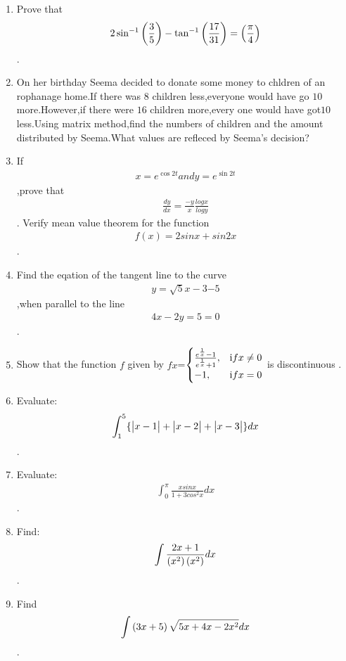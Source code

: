 \documentclass[12pt, letterpaper]{article}
\begin{document}
\begin{enumerate}
	\item Prove that \begin{align}2\sin^{-1}\left(\frac{3}{5}\right)-\tan^{-1}\left(\frac{17}{31}\right)=\left(\frac{\pi}{4}\right)\end{align}.
\item On her birthday Seema decided to donate some money to chldren of an rophanage home.If there was $8$ children less,everyone would have go \rupee $10$ more.However,if there were $16$ children more,every one would have got\rupee $10$ less.Using matrix method,find the numbers of children and the amount distributed by Seema.What values are refleced by Seema's decision?
\item If \begin{align}x=e^{\cos2t} and y=e^{\sin2t}\end{align},prove that \begin{align}\frac{dy}{dx}=\frac{-y}{x} \frac{logx}{logy}\end{align}. Verify mean value theorem for the function \begin{align}f(x)=2sinx+sin2x \end{align}.
	\item Find the eqation of the tangent line to the curve \begin{align}y={\sqrt5x-3}{-5}\end{align},when parallel to the line \begin{align}4x-2y=5=0\end{align} .
		\item Show that the function $f$ given by $fx$=$\begin{cases}\frac{e^{\frac{1}{x}}-1}{e^{\frac{1}{x}}+1},& \text if x\neq0\\ -1,& \text if x=0 \end{cases}$ is discontinuous . 
				\item Evaluate: \begin{align}\int_{1}^{5} \{\begin{vmatrix}x-1\end{vmatrix} + \begin{vmatrix}x-2\end{vmatrix} + \begin{vmatrix}x-3\end{vmatrix}\}dx\end{align}.
					\item Evaluate: \begin{align}\int_{0}^{\pi} \frac{xsinx}{1+3cos^2x}dx\end{align}.
						\item Find: \begin{align}\int\frac{2x+1}{\left(x^2\right)\left(x^2\right)}dx\end{align}.
							\item Find \begin{align}\int \left(3x+5\right) \sqrt{5x+4x-2x^2}dx\end{align} .

\end{enumerate}
\end{document}
